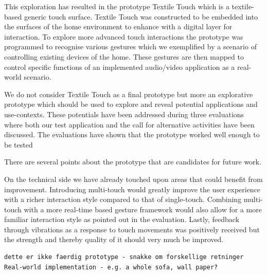 This exploration has resulted in the prototype Textile Touch which is a textile-based generic touch surface.
Textile Touch was constructed to be embedded into the surfaces of the home environment to enhance with a digital layer for interaction.
To explore more advanced touch interactions the prototype was programmed to recognise various gestures which we exemplified by a scenario of controlling existing devices of the home. These gestures are then mapped to control specific functions of an implemented audio/video application as a real-world scenario.

We do not consider Textile Touch as a final prototype but more an explorative prototype which should be used to explore and reveal potential applications and use-contexts.
These potentials have been addressed during three evaluations where both our test application and the call for alternative activities have been discussed.
The evaluations have shown that the prototype worked well enough to be tested 



There are several points about the prototype that are candidates for future work.

On the technical side we have already touched upon areas that could benefit from improvement.
Introducing multi-touch would greatly improve the user experience with a richer interaction style compared to that of single-touch.
Combining multi-touch with a more real-time based gesture framework would also allow for a more familiar interaction style as pointed out in the evaluation.
Lastly, feedback through vibrations as a response to touch movements was positively received but the strength and thereby quality of it should very much be improved.



\begin{verbatim}
dette er ikke faerdig prototype - snakke om forskellige retninger
Real-world implementation - e.g. a whole sofa, wall paper?
\end{verbatim}

